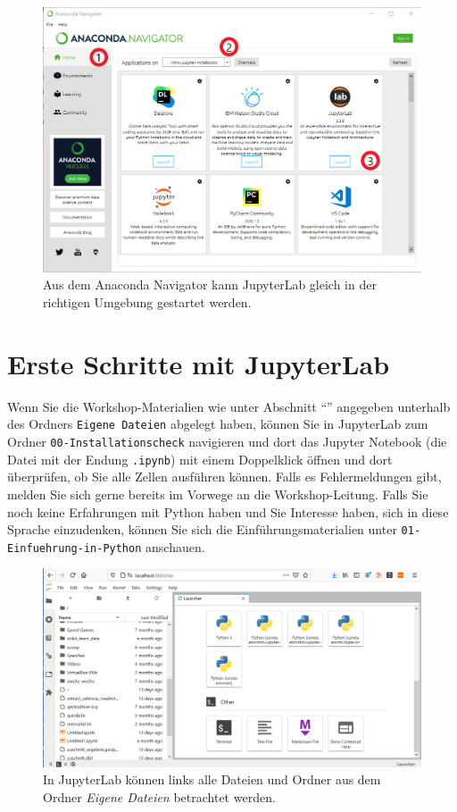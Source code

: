 \documentclass{tufte-handout}
\begin{document}
\begin{figure}[h]
  \includegraphics{anaconda-navigator-jupyterlab--mit-reihenfolge}
  \caption{Aus dem Anaconda Navigator kann JupyterLab gleich in der richtigen Umgebung gestartet werden.}%
\label{fig:start-jupyterlab}
\end{figure}

\section{Erste Schritte mit JupyterLab}

Wenn Sie die Workshop-Materialien wie unter Abschnitt \enquote{} angegeben unterhalb des Ordners \texttt{Eigene Dateien} abgelegt haben, 
können Sie in JupyterLab zum Ordner 
\texttt{00-Installationscheck}
navigieren und dort das Jupyter Notebook (die Datei mit der Endung \texttt{.ipynb}) mit einem Doppelklick öffnen
und dort überprüfen, ob Sie alle Zellen ausführen können.
Falls es Fehlermeldungen gibt, melden Sie sich gerne bereits im Vorwege an die Workshop-Leitung.
Falls Sie noch keine Erfahrungen mit Python haben und Sie Interesse haben, sich in diese Sprache einzudenken,
können Sie sich die Einführungsmaterialien unter
\texttt{01-Einfuehrung-in-Python}
anschauen.

\begin{figure}[h]
  \includegraphics{jupyterlab-running}
  \caption{In JupyterLab können links alle Dateien und Ordner aus dem Ordner \emph{Eigene Dateien} betrachtet werden.}%
\label{fig:start-jupyterlab}
\end{figure}
\end{document}
